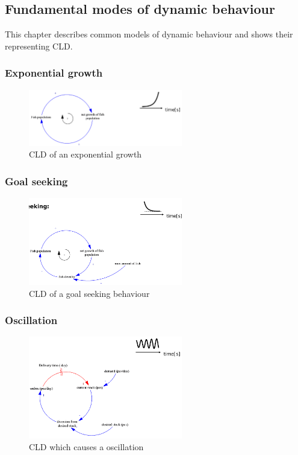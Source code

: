 \subsection{Fundamental modes of dynamic behaviour}

This chapter describes common models of dynamic behaviour and shows their
representing CLD.

\subsubsection{Exponential growth}

\begin{figure}[H]
	\centering
	\includegraphics[width=0.6\textwidth]{figures/ExponentialGrowthCLD.png}
	\caption{CLD of an exponential growth}
\end{figure}


\subsubsection{Goal seeking}
\begin{figure}[H]
	\centering
	\includegraphics[width=0.6\textwidth]{figures/GoalSeekingCLD.png}
	\caption{CLD of a goal seeking behaviour}
\end{figure}

\subsubsection{Oscillation}
\begin{figure}[H]
	\centering
	\includegraphics[width=0.6\textwidth]{figures/OscillationCLD.png}
	\caption{CLD which causes a oscillation}
\end{figure}

